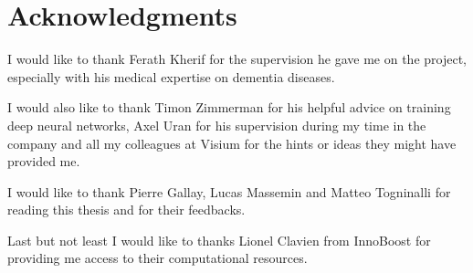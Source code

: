 \chapter{Acknowledgments}
I would like to thank Ferath Kherif for the supervision he gave me on the project, especially with his medical expertise on dementia diseases.

I would also like to thank Timon Zimmerman for his helpful advice on training deep neural networks, Axel Uran for his supervision during my time in the company and all my colleagues at Visium\footnotemark{} for the hints or ideas they might have provided me.

I would like to thank Pierre Gallay, Lucas Massemin and Matteo Togninalli for reading this thesis and for their feedbacks.

Last but not least I would like to thanks Lionel Clavien from InnoBoost\footnotemark{} for providing me access to their computational resources.

